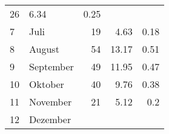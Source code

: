 \begin{longtable}{lXrrr}
       \num{26} &
       \num[round-mode=places,round-precision=2]{6,34} &
         \num[round-mode=places,round-precision=2]{0,25} \\

     7 &
     \multicolumn{1}{X}{ Juli   } &


       \num{19} &
       \num[round-mode=places,round-precision=2]{4,63} &
         \num[round-mode=places,round-precision=2]{0,18} \\

     8 &
     \multicolumn{1}{X}{ August   } &


       \num{54} &
       \num[round-mode=places,round-precision=2]{13,17} &
         \num[round-mode=places,round-precision=2]{0,51} \\

     9 &
     \multicolumn{1}{X}{ September   } &


       \num{49} &
       \num[round-mode=places,round-precision=2]{11,95} &
         \num[round-mode=places,round-precision=2]{0,47} \\

     10 &
     \multicolumn{1}{X}{ Oktober   } &


       \num{40} &
       \num[round-mode=places,round-precision=2]{9,76} &
         \num[round-mode=places,round-precision=2]{0,38} \\

     11 &
     \multicolumn{1}{X}{ November   } &


       \num{21} &
       \num[round-mode=places,round-precision=2]{5,12} &
         \num[round-mode=places,round-precision=2]{0,2} \\

     12 &
     \multicolumn{1}{X}{ Dezember   } &



\end{longtable}
